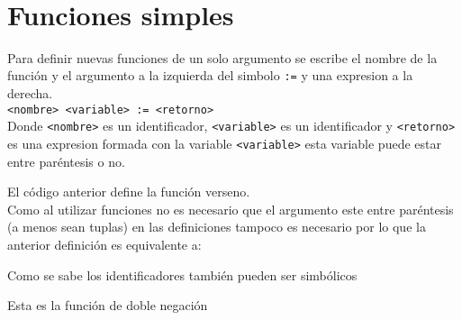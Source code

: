      \begin{fxcode}
         \\
          
      \end{fxcode}
      
   \section{Funciones simples}
      Para definir nuevas funciones de un solo argumento se escribe el nombre de la función y el argumento a la izquierda del simbolo \texttt{:=} y una expresion a la derecha.
      \\
      
      \texttt{<nombre> <variable> := <retorno>}
      \\
      
      Donde \texttt{<nombre>} es un identificador, \texttt{<variable>} es un identificador y \texttt{<retorno>} es una expresion formada con la variable \texttt{<variable>} esta variable puede estar entre paréntesis o no.
      
      \begin{fxcode}
      \end{fxcode}
      
      El código anterior define la función verseno.
      \\
      
      Como al utilizar funciones no es necesario que el argumento este entre paréntesis (a menos sean tuplas) en las definiciones tampoco es necesario por lo que la anterior definición es equivalente a:
      
      \begin{fxcode}
      \end{fxcode}
      
      Como se sabe los identificadores también pueden ser simbólicos
      
      \begin{fxcode}
      \end{fxcode}
      
      Esta es la función de doble negación
      
      \begin{fxcode}
      \end{fxcode}
      
